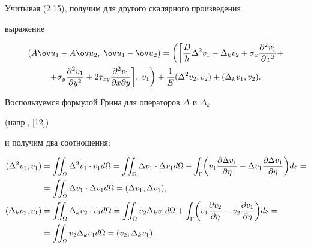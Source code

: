  


Учитывая (2.15), получим для другого скалярного произведения 


выражение 


\begin{multline} 


(A\ov u_1-A\ov u_2,\;\ov u_1-\ov u_2)= 


\biggl(\biggr[\frac{D}{h}\Delta^2v_1-\Delta_kv_2+\sigma_x 


\frac{\partial^2 v_1}{\partial x^2}+\\ 


+\sigma_y\frac{\partial^2 v_1}{\partial y^2}+2\tau_{xy} 


\frac{\partial^2 v_1}{\partial x\partial y}\biggr],\;v_1\biggr)+ 


\frac{1}{E}(\Delta^2v_2,v_2)+(\Delta_kv_1,v_2). 


\end{multline} 


Воспользуемся формулой Грина для операторов $\Delta$ и $\Delta_k$ 


(напр., [12]) 


и получим два соотношения: 


\begin{align} 


(\Delta^2v_1,v_1)&=\iint_\Omega\Delta^2v_1\cdot v_1d\Omega= 


\iint_\Omega\Delta v_1\cdot\Delta v_1d\Omega+\int_\Gamma 


\biggl(v_1\frac{\partial\Delta v_1}{\partial\eta}- 


\Delta v_1\frac{\partial\Delta v_1}{\partial\eta}\biggr)ds=\notag\\ 


&=\iint_\Omega\Delta v_1\cdot\Delta v_1d\Omega= 


(\Delta v_1,\Delta v_1),\\ 


(\Delta_k v_2,v_1)&=\iint_\Omega \Delta_k v_2\cdot v_1d\Omega= 


\iint_\Omega v_2\Delta_k v_1d\Omega+\int_\Gamma 


\biggl(v_1\frac{\partial v_2}{\partial\eta}-v_2 


\frac{\partial v_1}{\partial\eta}\biggr)ds=\notag \\ 


&=\iint_\Omega v_2\Delta_k v_1d\Omega=(v_2,\Delta_k v_1). 


\end{align} 


